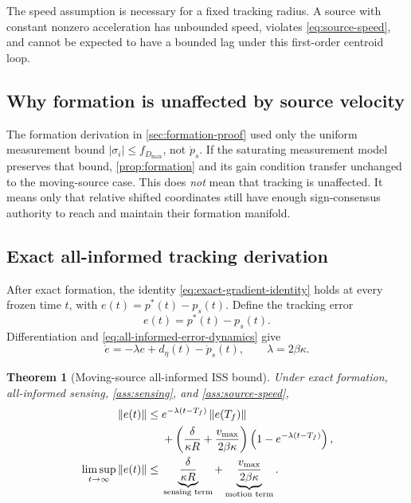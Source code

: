\documentclass[11pt]{article}
\newtheorem{theorem}{Theorem}
\newcommand{\norm}[1]{\left\lVert #1\right\rVert}
\begin{document}
The speed assumption is necessary for a fixed tracking radius. A source with constant nonzero acceleration has unbounded speed, violates \eqref{eq:source-speed}, and cannot be expected to have a bounded lag under this first-order centroid loop.

\subsection{Why formation is unaffected by source velocity}

The formation derivation in \cref{sec:formation-proof} used only the uniform measurement bound $|\sigma_i|\leq f_{D_{\max}}$, not $\dot p_s$. If the saturating measurement model preserves that bound, \cref{prop:formation} and its gain condition transfer unchanged to the moving-source case. This does \emph{not} mean that tracking is unaffected. It means only that relative shifted coordinates still have enough sign-consensus authority to reach and maintain their formation manifold.

\subsection{Exact all-informed tracking derivation}\label{sec:moving-exact}

After exact formation, the identity \eqref{eq:exact-gradient-identity} holds at every frozen time $t$, with $e(t)=p^*(t)-p_s(t)$. Define the tracking error
\begin{equation}\label{eq:moving-error}
    e(t)=p^*(t)-p_s(t).
\end{equation}
Differentiation and \eqref{eq:all-informed-error-dynamics} give
\begin{equation}\label{eq:moving-error-dynamics}
    \dot e=-\lambda e+d_\eta(t)-\dot p_s(t),
    \qquad \lambda=2\beta\kappa.
\end{equation}

\begin{theorem}[Moving-source all-informed ISS bound]\label{thm:moving-iss}
Under exact formation, all-informed sensing, \cref{ass:sensing}, and \cref{ass:source-speed},
\begin{align}
    \norm{e(t)}\leq{}&e^{-\lambda(t-T_f)}\norm{e(T_f)}\notag\\
    &+\left(\frac{\delta}{\kappa R}+\frac{v_{\max}}{2\beta\kappa}\right)
    \left(1-e^{-\lambda(t-T_f)}\right),\label{eq:moving-transient-bound}\\
    \limsup_{t\to\infty}\norm{e(t)}\leq{}&
    \underbrace{\frac{\delta}{\kappa R}}_{\text{sensing term}}
    +\underbrace{\frac{v_{\max}}{2\beta\kappa}}_{\text{motion term}}.\label{eq:moving-ultimate-bound}
\end{align}
\end{theorem}
\end{document}
